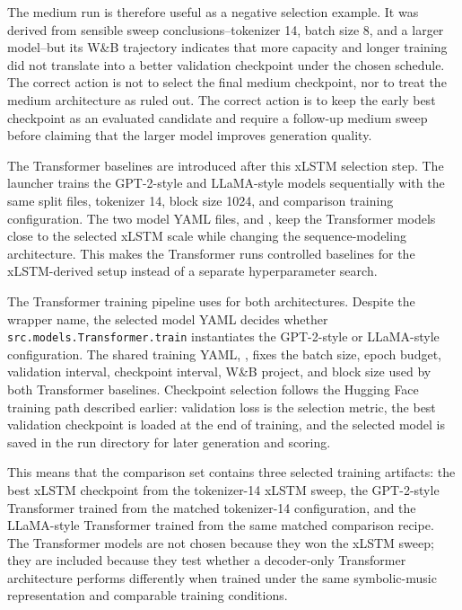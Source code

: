 The medium run is therefore useful as a negative selection example. It was derived from sensible sweep conclusions--tokenizer 14, batch size 8, and a larger model--but its W\&B trajectory indicates that more capacity and longer training did not translate into a better validation checkpoint under the chosen schedule. The correct action is not to select the final medium checkpoint, nor to treat the medium architecture as ruled out. The correct action is to keep the early best checkpoint as an evaluated candidate and require a follow-up medium sweep before claiming that the larger model improves generation quality.

The Transformer baselines are introduced after this xLSTM selection step. The launcher  trains the GPT-2-style and LLaMA-style models sequentially with the same split files, tokenizer 14, block size 1024, and comparison training configuration. The two model YAML files,  and , keep the Transformer models close to the selected xLSTM scale while changing the sequence-modeling architecture. This makes the Transformer runs controlled baselines for the xLSTM-derived setup instead of a separate hyperparameter search.

The Transformer training pipeline uses  for both architectures. Despite the wrapper name, the selected model YAML decides whether \verb|src.models.Transformer.train| instantiates the GPT-2-style or LLaMA-style configuration. The shared training YAML, , fixes the batch size, epoch budget, validation interval, checkpoint interval, W\&B project, and block size used by both Transformer baselines. Checkpoint selection follows the Hugging Face training path described earlier: validation loss is the selection metric, the best validation checkpoint is loaded at the end of training, and the selected model is saved in the run directory for later generation and scoring.

This means that the comparison set contains three selected training artifacts: the best xLSTM checkpoint from the tokenizer-14 xLSTM sweep, the GPT-2-style Transformer trained from the matched tokenizer-14 configuration, and the LLaMA-style Transformer trained from the same matched comparison recipe. The Transformer models are not chosen because they won the xLSTM sweep; they are included because they test whether a decoder-only Transformer architecture performs differently when trained under the same symbolic-music representation and comparable training conditions.

